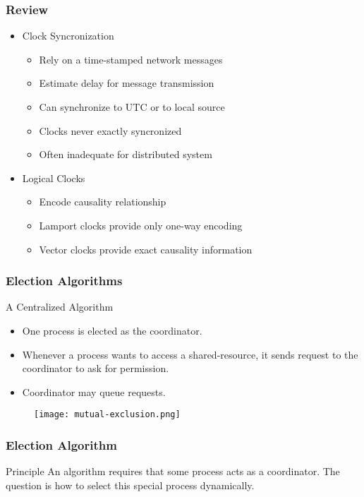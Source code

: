 \begin{frame}
    \frametitle{Review}
    \begin{itemize}
        \item Clock Syncronization
            \begin{itemize}
                \item Rely on a time-stamped network messages
                \item Estimate delay for message transmission
                \item Can synchronize to UTC or to local source
                \item Clocks never exactly syncronized
                \item Often inadequate for distributed system
            \end{itemize}
        \item Logical Clocks
            \begin{itemize}
                \item Encode causality relationship
                \item Lamport clocks provide only one-way encoding
                \item Vector clocks provide exact causality information
            \end{itemize}
    \end{itemize}
\end{frame}

\begin{frame}
    \frametitle{Election Algorithms}
A Centralized Algorithm
\begin{itemize}
    \item One process is elected as the coordinator.
    \item Whenever a process wants to access a shared-resource, it sends request to the coordinator to ask for permission.
    \item Coordinator may queue requests.
\end{itemize}
\begin{figure}
    \centering
    \texttt{[image: mutual-exclusion.png]}
\end{figure}

\end{frame}

\begin{frame}
    \frametitle{Election Algorithm}
\begin{block}{Principle}
    An algorithm requires that some process acts as a coordinator. The question is how to select this special process dynamically.
\end{block}

\end{frame}

